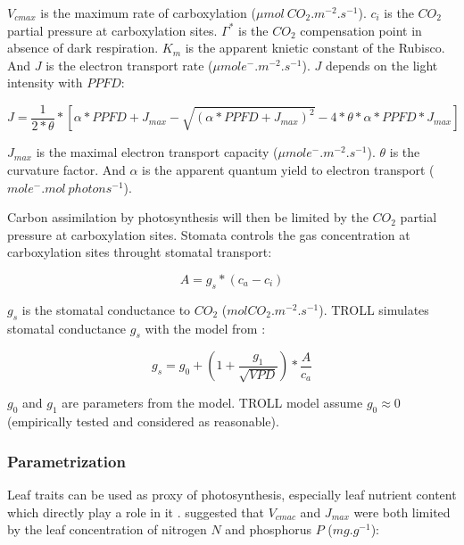\documentclass[12pt,]{article}
\theoremstyle{definition}
\theoremstyle{definition}
\theoremstyle{remark}
\begin{document}
\(V_{cmax}\) is the maximum rate of carboxylation
(\(\mu mol~CO_2.m^{-2}.s^{-1}\)). \(c_i\) is the \(CO_2\) partial
pressure at carboxylation sites. \(\Gamma^*\) is the \(CO_2\)
compensation point in absence of dark respiration. \(K_m\) is the
apparent knietic constant of the Rubisco. And \(J\) is the electron
transport rate (\(\mu mol e^-.m^{-2}.s^{-1}\)). \(J\) depends on the
light intensity with \(PPFD\):

\begin{equation}
  J = \frac{1}{2*\theta}*[\alpha*PPFD+J_{max}-\sqrt{(\alpha*PPFD+J_{max})^2}-4*\theta*\alpha*PPFD*J_{max}]
  \label{eq:J}
\end{equation}

\(J_{max}\) is the maximal electron transport capacity
(\(\mu mol e^-.m^{-2}.s^{-1}\)). \(\theta\) is the curvature factor. And
\(\alpha\) is the apparent quantum yield to electron transport
(\(mole^-.mol~photons^{-1}\)).

Carbon assimilation by photosynthesis will then be limited by the
\(CO_2\) partial pressure at carboxylation sites. Stomata controls the
gas concentration at carboxylation sites throught stomatal transport:

\begin{equation}
  A = g_s*(c_a-c_i)
  \label{eq:Ag}
\end{equation}

\(g_s\) is the stomatal conductance to \(CO_2\)
(\(molCO_2.m^{-2}.s^{-1}\)). TROLL simulates stomatal conductance
\(g_s\) with the model from \citep{Medlyn2011}:

\begin{equation}
  g_s = g_0 + (1 + \frac{g_1}{\sqrt{VPD}})*\frac{A}{c_a}
  \label{eq:gs}
\end{equation}

\(g_0\) and \(g_1\) are parameters from the model. TROLL model assume
\(g_0 \approx 0\) (empirically tested and considered as reasonable).

\subsubsection{Parametrization}\label{parametrization}

Leaf traits can be used as proxy of photosynthesis, especially leaf
nutrient content which directly play a role in it
\citep{wright_worldwide_2004}. \citet{Domingues2010} suggested that
\(V_{cmac}\) and \(J_{max}\) were both limited by the leaf concentration
of nitrogen \(N\) and phosphorus \(P\) (\(mg.g^{-1}\)):
\end{document}

